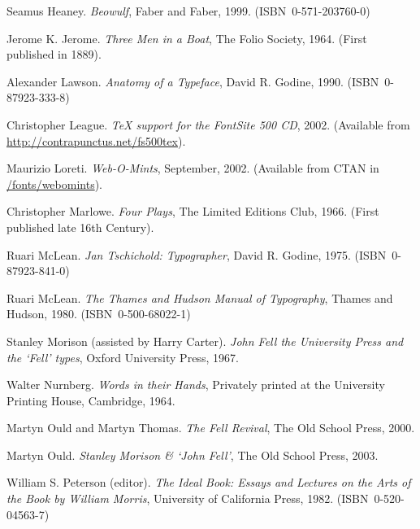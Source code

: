 \documentclass{memoir}
\newcommand*{\isbn}{{\small\textsc{ISBN}}}
\begin{document}
\begin{thebibliography}{RCHM99}
  Seamus Heaney.
\newblock \emph{Beowulf},
\newblock Faber and Faber, 1999. (\isbn\ 0-571-203760-0)

  Jerome K. Jerome.
\newblock \emph{Three Men in a Boat},
\newblock The Folio Society, 1964.
\newblock (First published in 1889).

  Alexander Lawson.
\newblock \emph{Anatomy of a Typeface},
\newblock David R. Godine, 1990. (\isbn\ 0-87923-333-8)

  Christopher League.
  \newblock \emph{\TeX{} support for the FontSite 500 CD}, 2002.
\newblock (Available from \url{http://contrapunctus.net/fs500tex}).


  Maurizio Loreti.
\newblock \emph{Web-O-Mints}, September, 2002.
\newblock (Available from CTAN in \url{/fonts/webomints}).

  Christopher Marlowe.
\newblock \emph{Four Plays},
\newblock The Limited Editions Club, 1966.
\newblock (First published late 16th Century).

  Ruari McLean.
\newblock \emph{Jan Tschichold: Typographer},
\newblock David R. Godine, 1975. (\isbn\ 0-87923-841-0)

  Ruari McLean.
\newblock \emph{The Thames and Hudson Manual of Typography},
\newblock Thames and Hudson, 1980. (\isbn\ 0-500-68022-1)

  Stanley Morison (assisted by Harry Carter).
\newblock \emph{John Fell the University Press and the `Fell' types},
\newblock Oxford University Press, 1967.

  Walter Nurnberg.
\newblock \emph{Words in their Hands},
\newblock Privately printed at the University Printing House, Cambridge, 1964.

  Martyn Ould and Martyn Thomas.
\newblock \emph{The Fell Revival},
\newblock The Old School Press, 2000.

  Martyn Ould.
\newblock \emph{Stanley Morison \& `John Fell'},
\newblock The Old School Press, 2003.

  William S. Peterson (editor).
\newblock \emph{The Ideal Book: Essays and Lectures on the Arts of the Book
                by William Morris},
\newblock University of California Press, 1982. (\isbn\ 0-520-04563-7)


\end{thebibliography}
\end{document}
